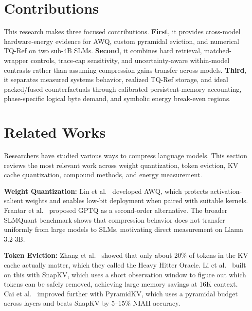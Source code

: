 \documentclass[conference]{IEEEtran}
\begin{document}
\section{Contributions}

This research makes three focused contributions. \textbf{First}, it provides cross-model hardware-energy evidence for AWQ, custom pyramidal eviction, and numerical TQ-Ref on two sub-4B SLMs. \textbf{Second}, it combines hard retrieval, matched-wrapper controls, trace-cap sensitivity, and uncertainty-aware within-model contrasts rather than assuming compression gains transfer across models. \textbf{Third}, it separates measured systems behavior, realized TQ-Ref storage, and ideal packed/fused counterfactuals through calibrated persistent-memory accounting, phase-specific logical byte demand, and symbolic energy break-even regions.


\section{Related Works}

Researchers have studied various ways to compress language models. This section reviews the most relevant work across weight quantization, token eviction, KV cache quantization, compound methods, and energy measurement.

\textbf{Weight Quantization:} Lin et al.\ \cite{lin_awq_2025} developed AWQ, which protects activation-salient weights and enables low-bit deployment when paired with suitable kernels. Frantar et al.\ \cite{frantar_gptq_2023} proposed GPTQ as a second-order alternative. The broader SLMQuant benchmark \cite{wang_slmquant_2025} shows that compression behavior does not transfer uniformly from large models to SLMs, motivating direct measurement on Llama 3.2-3B.

\textbf{Token Eviction:} Zhang et al.\ \cite{zhang_h2o_nodate} showed that only about 20\% of tokens in the KV cache actually matter, which they called the Heavy Hitter Oracle. Li et al.\ \cite{li_snapkv_nodate} built on this with SnapKV, which uses a short observation window to figure out which tokens can be safely removed, achieving large memory savings at 16K context. Cai et al.\ \cite{cai_pyramidkv_2025} improved further with PyramidKV, which uses a pyramidal budget across layers and beats SnapKV by 5--15\% NIAH accuracy.
\end{document}
